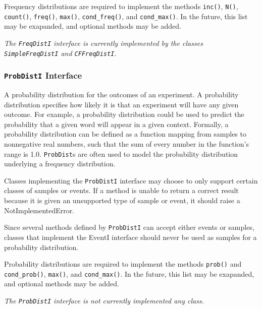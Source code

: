\documentclass{article}
\begin{document}
    Frequency distributions are required to implement the methods
    \texttt{inc()}, \texttt{N()}, \texttt{count()},
    \texttt{freq()}, \texttt{max()}, \texttt{cond\_freq()}, 
    and \texttt{cond\_max()}.  In the future, this list may be
    exapanded, and optional methods may be added.

\vspace{2mm}\noindent
\textit{The \texttt{FreqDistI} interface is currently implemented by the
classes \texttt{SimpleFreqDistI} and \texttt{CFFreqDistI}.}

\subsubsection{\texttt{ProbDistI} Interface}

    A probability distribution for the outcomes of an experiment.  A
    probability distribution specifies how likely it is that an
    experiment will have any given outcome.  For example, a
    probability distribution could be used to predict the probability
    that a given word will appear in a given context.  Formally, a
    probability distribution can be defined as a function mapping from
    samples to nonnegative real numbers, such that the sum of every
    number in the function's range is 1.0.  \texttt{ProbDist}s are
    often used to model the probability distribution underlying a
    frequency distribution. 

    Classes implementing the \texttt{ProbDistI} interface may
    choose to only support certain classes of samples or events.  If a
    method is unable to return a correct result because it is given an
    unsupported type of sample or event, it should raise a
    NotImplementedError. 

    Since several methods defined by \texttt{ProbDistI} can accept
    either events or samples, classes that implement the EventI
    interface should never be used as samples for a probability
    distribution.

    Probability distributions are required to implement the methods
    \texttt{prob()} and \texttt{cond\_prob()},
    \texttt{max()}, and \texttt{cond\_max()}.  In the future,
    this list may be exapanded, and optional methods may be added.

\vspace{2mm}\noindent
\textit{The \texttt{ProbDistI} interface is not currently implemented
any class.}
\end{document}
